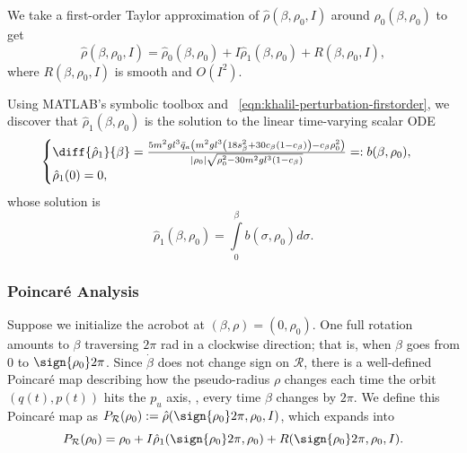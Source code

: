 We take a first-order Taylor approximation of \(\hat{\rho}(\beta,\rho_0,I)\)
around \(\hat{\rho}_0(\beta,\rho_0)\) to get
\begin{equation}\label{eqn:acrobot-rhohat-approx}
    \hat{\rho}(\beta,\rho_0,I) = \hat{\rho}_0(\beta,\rho_0) +
    I\hat{\rho}_1(\beta,\rho_0) + R(\beta,\rho_0,I)
    ,
\end{equation}
where \(R(\beta,\rho_0,I)\) is smooth and \(O(I^2)\).

Using MATLAB's symbolic toolbox and 
~\eqref{eqn:khalil-perturbation-firstorder}, 
we discover that \(\hat{\rho}_1(\beta,\rho_0)\) is the solution to the linear
time-varying scalar ODE
\begin{equation}\label{eqn:acrobot-rho1-dot}
  \begin{cases}
      \diff{\hat{\rho}_1}{\beta} =
    \frac{5m^2 g l^3 \bar{q}_a \left(
        m^2gl^3\left(18s_\beta^2 + 30c_\beta(1 - c_\beta)\right)
        - c_\beta\rho_0^2
    \right)}{
    |\rho_0|\sqrt{\rho_0^2 - 30m^2gl^3(1 - c_\beta)}
    }
    =: b(\beta,\rho_0)
     , \\
     \hat{\rho}_1(0) = 0
     ,
 \end{cases}
\end{equation}
whose solution is
\[
    \hat{\rho}_1(\beta,\rho_0) = \int \limits_0^\beta b(\sigma,\rho_0)d\sigma
    .
\]

\subsubsection*{Poincar\'{e} Analysis}


Suppose we initialize the acrobot at \((\beta,\rho) = (0,\rho_0)\).
One full rotation amounts to \(\beta\) traversing \(2\pi\) rad in a clockwise
direction; that is, when \(\beta\) goes from \(0\) to \(\sign{\rho_0}2\pi\).
Since \(\dot{\beta}\) does not change sign on \(\mathcal{R}\),
there is a well-defined Poincar\'{e} map describing how the pseudo-radius
\(\rho\) changes each time the orbit \((q(t),p(t))\) hits the \(p_u\) axis, \ie,
every time \(\beta\) changes by \(2\pi\).
We define this Poincar\'{e} map as
\(P_\mathcal{R}(\rho_0) := \hat{\rho}(\sign{\rho_0}2\pi,\rho_0,I)\),
which expands into
\[
    P_\mathcal{R}(\rho_0) = \rho_0 + I \hat{\rho}_1(\sign{\rho_0}2\pi, \rho_0)
    + R(\sign{\rho_0}2\pi,\rho_0,I)
    .
\]

